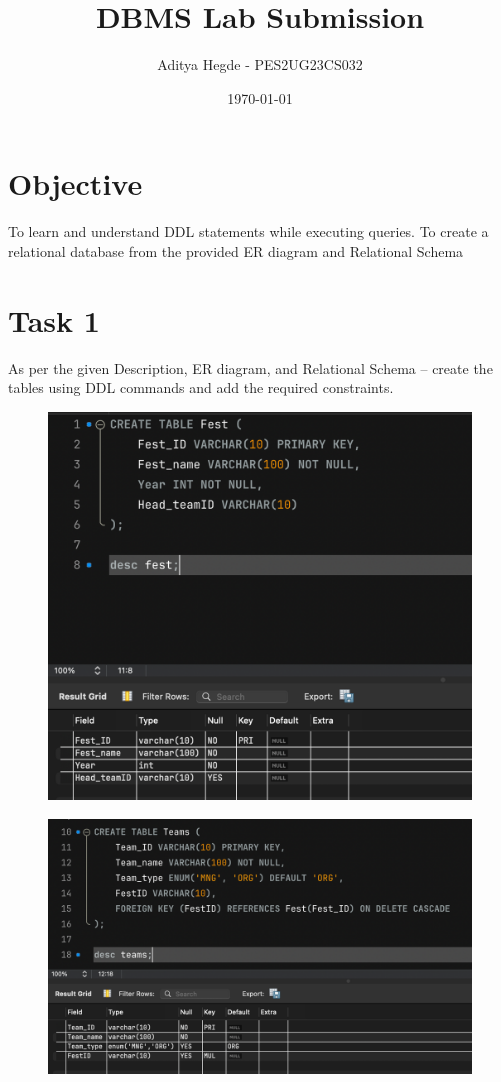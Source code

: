 \documentclass{article}
\title{DBMS Lab Submission}
\author{Aditya Hegde \@- PES2UG23CS032}
\date{\today}
\begin{document}
\maketitle

\section{Objective}

To learn and understand DDL statements while executing queries. To create a relational database from the provided ER diagram and Relational Schema

\section{Task 1}

As per the given Description, ER diagram, and Relational Schema \@– create the tables using DDL commands and add the required constraints.

\begin{figure}[H]
    \centering
    \includegraphics[width=0.7\linewidth]{images/task 1/1.png}
\end{figure}

\begin{figure}[H]
    \centering
    \includegraphics[width=0.7\linewidth]{images/task 1/2.png}
\end{figure}
\end{document}
